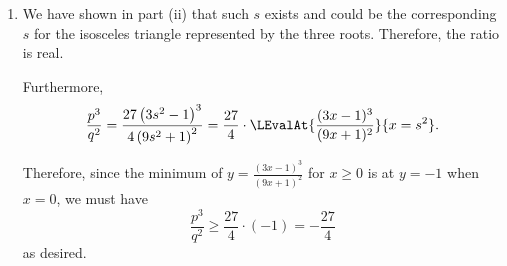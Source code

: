 \begin{enumerate}
    \item We have shown in part (ii) that such \(s\) exists and could be the corresponding \(s\) for the isosceles triangle represented by the three roots. Therefore, the ratio is real.

          Furthermore,
          \[
              \frac{p^3}{q^2} = \frac{27 \left(3 s^2 - 1\right)^3}{4 \left(9 s^2 + 1\right)^2} = \frac{27}{4} \cdot \LEvalAt{\frac{(3x - 1)^3}{(9x + 1)^2}}{x = s^2}.
          \]

          Therefore, since the minimum of \(y = \frac{(3x - 1)^3}{(9x + 1)^2}\) for \(x \geq 0\) is at \(y = -1\) when \(x = 0\), we must have
          \[
              \frac{p^3}{q^2} \geq \frac{27}{4} \cdot (-1) = - \frac{27}{4}
          \]
          as desired.
\end{enumerate}